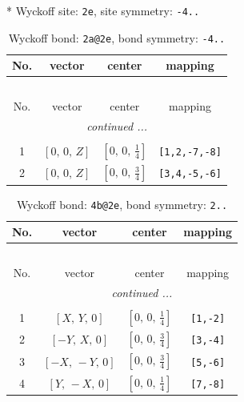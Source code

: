 \documentclass[fleqn,8pt]{jsarticle}
\begin{document}
* Wyckoff site: {\tt 2e}, site symmetry: {\tt -4..}
\renewcommand{\arraystretch}{1.2}
\begin{longtable}{cccc}
\caption{Wyckoff bond: {\tt 2a@2e}, bond symmetry: {\tt -4..}}
 \\
 \hline \hline
No. & vector & center & mapping \\ \hline \endfirsthead

\multicolumn{3}{l}{\tablename\ \thetable{}} \\
 \hline \hline
No. & vector & center & mapping \\ \hline \endhead

 \hline \hline
\multicolumn{3}{r}{\footnotesize\it continued ...} \\ \endfoot

 \hline \hline
\multicolumn{3}{r}{} \\ \endlastfoot

1 & $\left[ 0,\, 0,\, Z \right]$ & $\left[ 0,\, 0,\, \frac{1}{4} \right]$ & {\tt [1,2,-7,-8]} \\ \hline
2 & $\left[ 0,\, 0,\, Z \right]$ & $\left[ 0,\, 0,\, \frac{3}{4} \right]$ & {\tt [3,4,-5,-6]} \\
\end{longtable}
\renewcommand{\arraystretch}{1.2}
\begin{longtable}{cccc}
\caption{Wyckoff bond: {\tt 4b@2e}, bond symmetry: {\tt 2..}}
 \\
 \hline \hline
No. & vector & center & mapping \\ \hline \endfirsthead

\multicolumn{3}{l}{\tablename\ \thetable{}} \\
 \hline \hline
No. & vector & center & mapping \\ \hline \endhead

 \hline \hline
\multicolumn{3}{r}{\footnotesize\it continued ...} \\ \endfoot

 \hline \hline
\multicolumn{3}{r}{} \\ \endlastfoot

1 & $\left[ X,\, Y,\, 0 \right]$ & $\left[ 0,\, 0,\, \frac{1}{4} \right]$ & {\tt [1,-2]} \\ \hline
2 & $\left[ - Y,\, X,\, 0 \right]$ & $\left[ 0,\, 0,\, \frac{3}{4} \right]$ & {\tt [3,-4]} \\ \hline
3 & $\left[ - X,\, - Y,\, 0 \right]$ & $\left[ 0,\, 0,\, \frac{3}{4} \right]$ & {\tt [5,-6]} \\ \hline
4 & $\left[ Y,\, - X,\, 0 \right]$ & $\left[ 0,\, 0,\, \frac{1}{4} \right]$ & {\tt [7,-8]} \\
\end{longtable}
\end{document}
